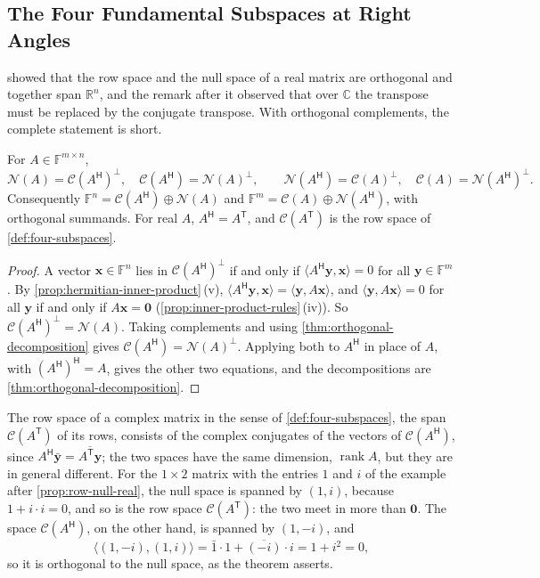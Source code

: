 \subsection{The Four Fundamental Subspaces at Right Angles}

 showed that the row space and the null space of a real matrix are orthogonal and together span $\mathbb R^n$, and the remark after it observed that over $\mathbb C$ the transpose must be replaced by the conjugate transpose. With orthogonal complements, the complete statement is short.

\begin{theorem}
\label{thm:four-subspaces-orthogonal}
For $A\in\mathbb F^{m\times n}$,
\[
\mathcal N(A)=\mathcal C(A^{\mathsf H})^\perp,\quad\mathcal C(A^{\mathsf H})=\mathcal N(A)^\perp,\qquad\mathcal N(A^{\mathsf H})=\mathcal C(A)^\perp,\quad\mathcal C(A)=\mathcal N(A^{\mathsf H})^\perp .
\]
Consequently $\mathbb F^n=\mathcal C(A^{\mathsf H})\oplus\mathcal N(A)$ and $\mathbb F^m=\mathcal C(A)\oplus\mathcal N(A^{\mathsf H})$, with orthogonal summands. For real $A$, $A^{\mathsf H}=A^{\mathsf T}$, and $\mathcal C(A^{\mathsf T})$ is the row space of \cref{def:four-subspaces}.
\end{theorem}

\begin{proof}
A vector $\mathbf x\in\mathbb F^n$ lies in $\mathcal C(A^{\mathsf H})^\perp$ if and only if $\langle A^{\mathsf H}\mathbf y,\mathbf x\rangle=0$ for all $\mathbf y\in\mathbb F^m$. By \cref{prop:hermitian-inner-product}\,(v), $\langle A^{\mathsf H}\mathbf y,\mathbf x\rangle=\langle\mathbf y,A\mathbf x\rangle$, and $\langle\mathbf y,A\mathbf x\rangle=0$ for all $\mathbf y$ if and only if $A\mathbf x=\mathbf 0$ (\cref{prop:inner-product-rules}\,(iv)). So $\mathcal C(A^{\mathsf H})^\perp=\mathcal N(A)$. Taking complements and using \cref{thm:orthogonal-decomposition} gives $\mathcal C(A^{\mathsf H})=\mathcal N(A)^\perp$. Applying both to $A^{\mathsf H}$ in place of $A$, with $(A^{\mathsf H})^{\mathsf H}=A$, gives the other two equations, and the decompositions are \cref{thm:orthogonal-decomposition}.
\end{proof}

The row space of a complex matrix in the sense of \cref{def:four-subspaces}, the span $\mathcal C(A^{\mathsf T})$ of its rows, consists of the complex conjugates of the vectors of $\mathcal C(A^{\mathsf H})$, since $A^{\mathsf H}\bar{\mathbf y}=\overline{A^{\mathsf T}\mathbf y}$; the two spaces have the same dimension, $\operatorname{rank}A$, but they are in general different. For the $1\times2$ matrix with the entries $1$ and $i$ of the example after \cref{prop:row-null-real}, the null space is spanned by $(1,i)$, because $1+i\cdot i=0$, and so is the row space $\mathcal C(A^{\mathsf T})$: the two meet in more than $\mathbf 0$. The space $\mathcal C(A^{\mathsf H})$, on the other hand, is spanned by $(1,-i)$, and
\[
\langle(1,-i),(1,i)\rangle=\bar1\cdot1+\overline{(-i)}\cdot i=1+i^2=0 ,
\]
so it is orthogonal to the null space, as the theorem asserts.

